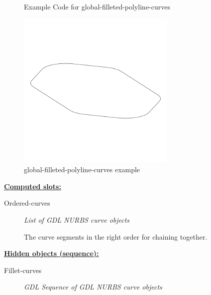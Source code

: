 \documentclass [11pt]{book}
\begin{document}
\begin{itemize}
\begin{figure}
\caption{Example Code for global-filleted-polyline-curves}

\label{fig:example-code-global-filleted-polyline-curves}

\end{figure}

\begin{figure}
\begin{center}
\includegraphics[width=3in,height=3in]{../images/example-global-filleted-polyline-curves.pdf}
\end{center}

\caption{global-filleted-polyline-curves example}

\label{fig:global-filleted-polyline-curves}

\end{figure}





\textbf{
\underline{Computed slots:}}

\begin{description}

\item [Ordered-curves]
\emph{List of GDL NURBS curve objects}

 The curve segments in the right order for chaining together.




\end{description}






\textbf{
\underline{Hidden objects (sequence):}}

\begin{description}

\item [Fillet-curves]
\emph{GDL Sequence of GDL NURBS curve objects}


\end{description}
\end{itemize}
\end{document}
